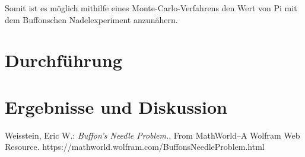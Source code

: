 \documentclass[10pt,twocolumn]{scrartcl}
\begin{document}
		Somit ist es möglich mithilfe eines Monte-Carlo-Verfahrens den Wert von Pi mit dem Buffonschen Nadelexperiment anzunähern.
		
\section*{Durchführung}

\section*{Ergebnisse und Diskussion}

\begin{thebibliography}{99}
	Weisstein, Eric W.: {\it Buffon's Needle Problem.}, From MathWorld--A Wolfram Web Resource. https://mathworld.wolfram.com/BuffonsNeedleProblem.html
\end{thebibliography}
\end{document}
